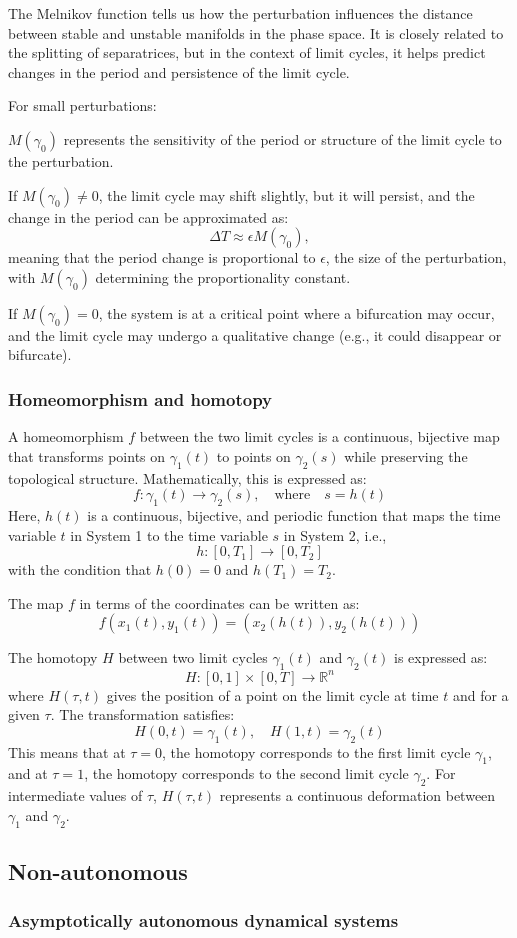 \documentclass{article}
\theoremstyle{definition}
\theoremstyle{remark}
\newcounter{ct}
\begin{document}
The Melnikov function tells us how the perturbation influences the distance between stable and unstable manifolds in the phase space. It is closely related to the splitting of separatrices, but in the context of limit cycles, it helps predict changes in the period and persistence of the limit cycle.

For small perturbations:

\(M(\gamma_0)\) represents the sensitivity of the period or structure of the limit cycle to the perturbation.

If \(M(\gamma_0) \neq 0\), the limit cycle may shift slightly, but it will persist, and the change in the period can be approximated as:
\[
\Delta T \approx \epsilon M(\gamma_0),
\]
meaning that the period change is proportional to \(\epsilon\), the size of the perturbation, with \(M(\gamma_0)\) determining the proportionality constant.

If \(M(\gamma_0) = 0\), the system is at a critical point where a bifurcation may occur, and the limit cycle may undergo a qualitative change (e.g., it could disappear or bifurcate).



\subsubsection{Homeomorphism and homotopy}

A homeomorphism \( f \) between the two limit cycles is a continuous, bijective map that transforms points on \( \gamma_1(t) \) to points on \( \gamma_2(s) \) while preserving the topological structure. Mathematically, this is expressed as:
\[
f: \gamma_1(t) \rightarrow \gamma_2(s), \quad \text{where} \quad s = h(t)
\]
Here, \( h(t) \) is a continuous, bijective, and periodic function that maps the time variable \( t \) in System 1 to the time variable \( s \) in System 2, i.e.,
\[
h: [0, T_1] \rightarrow [0, T_2]
\]
with the condition that \( h(0) = 0 \) and \( h(T_1) = T_2 \).

The map \( f \) in terms of the coordinates can be written as:
\[
f(x_1(t), y_1(t)) = (x_2(h(t)), y_2(h(t)))
\]



The homotopy \( H \) between two limit cycles \( \gamma_1(t) \) and \( \gamma_2(t) \) is expressed as:
\[
H: [0,1] \times [0, T] \rightarrow \mathbb{R}^n
\]
where \( H(\tau, t) \) gives the position of a point on the limit cycle at time \( t \) and for a given \( \tau \). The transformation satisfies:
\[
H(0, t) = \gamma_1(t), \quad H(1, t) = \gamma_2(t)
\]
This means that at \( \tau = 0 \), the homotopy corresponds to the first limit cycle \( \gamma_1 \), and at \( \tau = 1 \), the homotopy corresponds to the second limit cycle \( \gamma_2 \). For intermediate values of \( \tau \), \( H(\tau, t) \) represents a continuous deformation between \( \gamma_1 \) and \( \gamma_2 \).



\subsection{Non-autonomous}
\subsubsection{Asymptotically autonomous dynamical systems}
\citep{wieczorek2021compactification}
\end{document}

